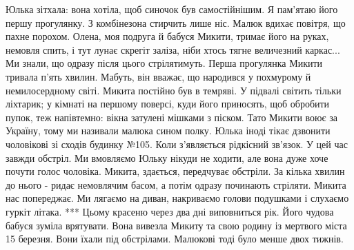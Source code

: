Юлька зітхала: вона хотіла, щоб синочок був самостійнішим.
Я пам'ятаю його першу прогулянку.
З комбінезона стирчить лише ніс.
Малюк  вдихає повітря, що пахне порохом. 
Олена, моя подруга й бабуся Микити, тримає його на руках, немовля спить, і тут лунає скрегіт заліза, ніби хтось тягне величезний  каркас...
Ми знали, що одразу після цього стрілятимуть. 
Перша прогулянка Микити тривала п'ять хвилин.
Мабуть, він вважає, що народився у похмурому й немилосердному світі. 
Микита постійно був  в темряві.
У підвалі світить тільки  ліхтарик;
у кімнаті на першому поверсі, куди його приносять, щоб обробити пупок, теж напівтемно:
вікна затулені мішками з піском.
Тато Микити воює за Україну, тому ми називали малюка сином полку. 
Юлька іноді тікає дзвонити чоловікові зі сходів будинку №105. 
Коли з'являється рідкісний зв'язок. 
У цей час завжди обстріл. 
Ми вмовляємо Юльку нікуди не ходити, але вона дуже хоче почути голос чоловіка.
Микита, здається, передчуває обстріли.
За кілька хвилин до  нього  -   ридає немовлячим басом, а потім одразу починають стріляти. 
Микита нас попереджає.
Ми лягаємо на диван, накриваємо голови подушками і слухаємо гуркіт літака.
***
Цьому красеню через два дні виповниться рік.
Його чудова бабуся зуміла врятувати.
Вона вивезла Микиту та свою родину  із мертвого міста 15 березня.
Вони їхали під обстрілами.
Малюкові тоді  було менше двох тижнів.
